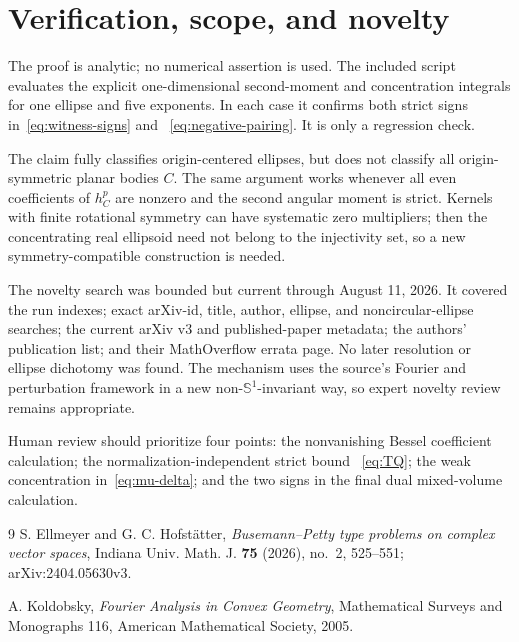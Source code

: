 \documentclass[11pt]{article}
\newcommand{\Sph}{\mathbb S}
\begin{document}
\section{Verification, scope, and novelty}

The proof is analytic; no numerical assertion is used.  The included script
 evaluates the explicit one-dimensional
second-moment and concentration integrals for one ellipse and five exponents.
In each case it confirms both strict signs in~\eqref{eq:witness-signs} and
~\eqref{eq:negative-pairing}.  It is only a regression check.

The claim fully classifies origin-centered ellipses, but does not classify all
origin-symmetric planar bodies $C$.  The same argument works whenever all even
coefficients of $h_C^p$ are nonzero and the second angular moment is strict.
Kernels with finite rotational symmetry can have systematic zero multipliers;
then the concentrating real ellipsoid need not belong to the injectivity set,
so a new symmetry-compatible construction is needed.

The novelty search was bounded but current through August 11, 2026.  It
covered the run indexes; exact arXiv-id, title, author, ellipse, and
noncircular-ellipse searches; the current arXiv v3 and published-paper
metadata; the authors' publication list; and their MathOverflow errata page.
No later resolution or ellipse dichotomy was found.  The mechanism uses the
source's Fourier and perturbation framework in a new non-$\Sph^1$-invariant
way, so expert novelty review remains appropriate.

Human review should prioritize four points: the nonvanishing Bessel
coefficient calculation; the normalization-independent strict bound
~\eqref{eq:TQ}; the weak concentration in~\eqref{eq:mu-delta}; and the two
signs in the final dual mixed-volume calculation.

\begin{thebibliography}{9}
S. Ellmeyer and G. C. Hofst\"atter,
\emph{Busemann--Petty type problems on complex vector spaces},
Indiana Univ. Math. J. \textbf{75} (2026), no.~2, 525--551;
arXiv:2404.05630v3.

A. Koldobsky,
\emph{Fourier Analysis in Convex Geometry},
Mathematical Surveys and Monographs 116, American Mathematical Society, 2005.
\end{thebibliography}
\end{document}
